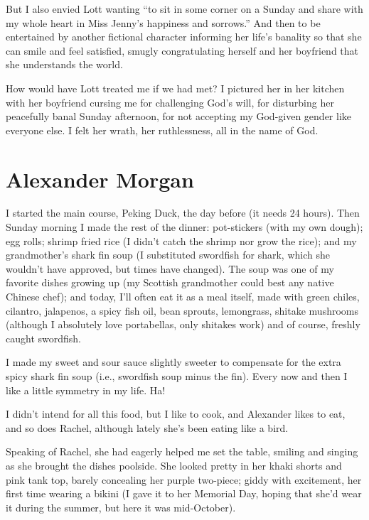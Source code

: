 But I also envied Lott wanting ``to sit in some corner on a Sunday and
share with my whole heart in Miss Jenny's happiness and sorrows.'' And
then to be entertained by another fictional character informing her
life's banality so that she can smile and feel satisfied, smugly
congratulating herself and her boyfriend that she understands the world.

How would have Lott treated me if we had met? I pictured her in her
kitchen with her boyfriend cursing me for challenging God's will, for
disturbing her peacefully banal Sunday afternoon, for not accepting my
God-given gender like everyone else. I felt her wrath, her ruthlessness,
all in the name of God.

\chapter{Alexander Morgan}

\titlemark

I started the main course, Peking Duck, the day before (it needs 24
hours). Then Sunday morning I made the rest of the dinner: pot-stickers
(with my own dough); egg rolls; shrimp fried rice (I didn't catch the
shrimp nor grow the rice); and my grandmother's shark fin soup (I
substituted swordfish for shark, which she wouldn't have approved, but
times have changed). The soup was one of my favorite dishes growing up
(my Scottish grandmother could best any native Chinese chef); and today,
I'll often eat it as a meal itself, made with green chiles, cilantro,
jalapenos, a spicy fish oil, bean sprouts, lemongrass, shitake mushrooms
(although I absolutely love portabellas, only shitakes work) and of
course, freshly caught swordfish.

I made my sweet and sour sauce slightly sweeter to compensate for the
extra spicy shark fin soup (i.e., swordfish soup minus the fin). Every
now and then I like a little symmetry in my life. Ha!

I didn't intend for all this food, but I like to cook, and Alexander
likes to eat, and so does Rachel, although lately she's been eating like
a bird.

Speaking of Rachel, she had eagerly helped me set the table, smiling and
singing as she brought the dishes poolside. She looked pretty in her
khaki shorts and pink tank top, barely concealing her purple two-piece;
giddy with excitement, her first time wearing a bikini (I gave it to her
Memorial Day, hoping that she'd wear it during the summer, but here it
was mid-October).

